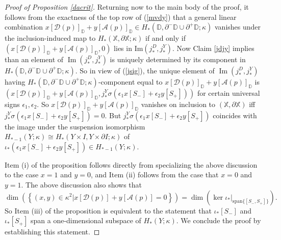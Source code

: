 \documentclass[11pt]{amsart}
\theoremstyle{definition}
\theoremstyle{remark}
\numberwithin{equation}{section}
\def\ep{\epsilon}
\DeclareMathOperator{\Img}{Im}
\begin{document}
\begin{proof}[Proof of Proposition \ref{dacrit}]
Returning now to the main body of the proof, it follows from the exactness of the top row of (\ref{mvdy}) that a general linear combination $x[\mathcal{D}(p)]_{\mathbb{D}}+y[\mathcal{A}(p)]_{\mathbb{D}}\in H_*(\mathbb{D},\partial^-\mathbb{D}\cup \partial^+\mathbb{D};\kappa)$ vanishes under the inclusion-induced map to $H_*(\mathbb{X},\partial\mathbb{X};\kappa)$ if and only if $\left(x[\mathcal{D}(p)]_{\mathbb{D}}+y[\mathcal{A}(p)]_{\mathbb{D}},0\right)$ lies in $\mathrm{Im}(j^D_*,j^Y_*)$. %
Now Claim \ref{jdjy} implies than an element of $\Img(j^D_*,j^Y_*)$ is uniquely determined by its component in $H_*(\mathbb{D},\partial^-\mathbb{D}\cup \partial^+\mathbb{D};\kappa)$.   So in view of (\ref{jsig}), the unique element of $\Img(j^D_*,j^Y_*)$ having $H_*(\mathbb{D},\partial^-\mathbb{D}\cup \partial^+\mathbb{D};\kappa)$-component equal to $x[\mathcal{D}(p)]_{\mathbb{D}}+y[\mathcal{A}(p)]_{\mathbb{D}}$ is $\left(x[\mathcal{D}(p)]_{\mathbb{D}}+y[\mathcal{A}(p)]_{\mathbb{D}},j^{Y}_{*}\sigma(\ep_1x[S_-]+\ep_2y[S_+])\right)$ for certain universal signs $\ep_1,\ep_2$.   So $x[\mathcal{D}(p)]_{\mathbb{D}}+y[\mathcal{A}(p)]_{\mathbb{D}}$ vanishes on inclusion to $(\mathbb{X},\partial\mathbb{X})$ iff $j^{Y}_{*}\sigma(\ep_1x[S_-]+\ep_2y[S_+])=0$.  But $j^{Y}_{*}\sigma(\ep_1x[S_-]+\ep_2y[S_+])$ coincides with the image under the suspension isomorphism $H_{*-1}(Y;\kappa)\cong  H_*(Y\times I,Y\times\partial I;\kappa)$ of $\iota_*(\ep_1x[S_-]+\ep_2y[S_+])\in H_{*-1}(Y;\kappa)$.

Item (i) of the proposition follows directly from specializing the above discussion to the case $x=1$ and $y=0$, and Item (ii) follows from the case that $x=0$ and $y=1$.  The above discussion also shows that \[\dim\left(\left\{(x,y)\in \kappa^2|x[\mathcal{D}(p)]+y[\mathcal{A}(p)]=0\right\}\right)=\dim\left(\ker \iota_*|_{\mathrm{span}\{[S_-,S_+]\}}\right).\]  So Item (iii) of the proposition is equivalent to the statement that $\iota_*[S_-]$ and $\iota_*[S_+]$ span a one-dimensional subspace of $H_*(Y;\kappa)$.  We conclude the proof by establishing this statement.


\end{proof}
\end{document}
